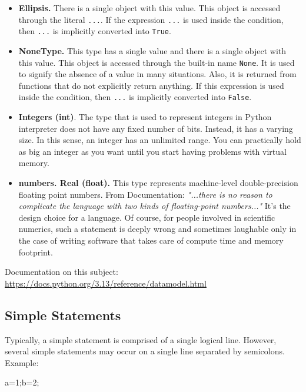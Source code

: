 \documentclass[
]{article}
\newenvironment{Shaded}{}{}
\newcommand{\DecValTok}[1]{\textcolor[rgb]{0.25,0.63,0.44}{#1}}
\newcommand{\NormalTok}[1]{#1}
\newcommand{\OperatorTok}[1]{\textcolor[rgb]{0.40,0.40,0.40}{#1}}
\begin{document}
\begin{itemize}
\item
  \textbf{Ellipsis.} There is a single object with this value. This
  object is accessed through the literal \texttt{...}. If the expression
  \texttt{...} is used inside the condition, then \texttt{...} is
  implicitly converted into \texttt{True}.
\item
  \textbf{NoneType.} This type has a single value and there is a single
  object with this value. This object is accessed through the built-in
  name \texttt{None}. It is used to signify the absence of a value in
  many situations. Also, it is returned from functions that do not
  explicitly return anything. If this expression is used inside the
  condition, then \texttt{...} is implicitly converted into
  \texttt{False}.
\item
  \textbf{Integers (int)}. The type that is used to represent integers
  in Python interpreter does not have any fixed number of bits. Instead,
  it has a varying size. In this sense, an integer has an unlimited
  range. You can practically hold as big an integer as you want until
  you start having problems with virtual memory.
\item
  \textbf{numbers. Real (float).} This type represents machine-level
  double-precision floating point numbers. From Documentation:
  \emph{"...there is no reason to complicate the language with two kinds
  of floating-point numbers..."} It's the design choice for a language.
  Of course, for people involved in scientific numerics, such a
  statement is deeply wrong and sometimes laughable only in the case of
  writing software that takes care of compute time and memory footprint.
\end{itemize}

Documentation on this subject:
\url{https://docs.python.org/3.13/reference/datamodel.html}

\hypertarget{simple-statements}{%
\subsection{Simple Statements}\label{simple-statements}}

Typically, a simple statement is comprised of a single logical line.
However, several simple statements may occur on a single line separated
by semicolons. Example:

\begin{Shaded}
\begin{Highlighting}[]
\NormalTok{a}\OperatorTok{=}\DecValTok{1}\OperatorTok{;}\NormalTok{b}\OperatorTok{=}\DecValTok{2}\OperatorTok{;}
\end{Highlighting}
\end{Shaded}
\end{document}
